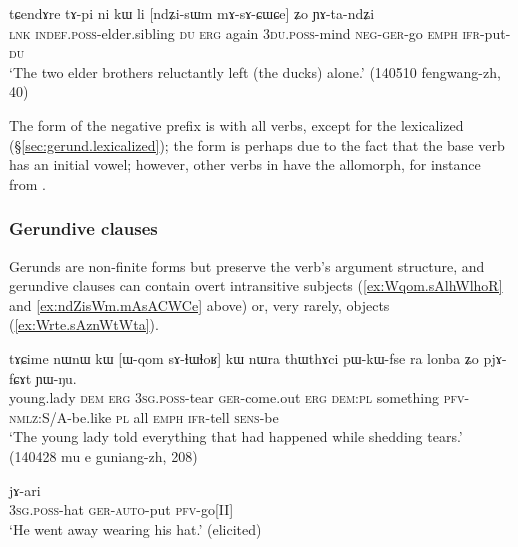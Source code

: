 \begin{exe}
\ex \label{ex:ndZisWm.mAsACWCe}
\gll tɕendɤre tɤ-pi ni kɯ li [ndʑi-sɯm mɤ-sɤ-ɕɯ\redp{}ɕe] ʑo ɲɤ-ta-ndʑi \\
\textsc{lnk} \textsc{indef}.\textsc{poss}-elder.sibling \textsc{du} \textsc{erg} again \textsc{3du}.\textsc{poss}-mind \textsc{neg}-\textsc{ger}-go \textsc{emph} \textsc{ifr}-put-\textsc{du} \\
\glt `The two elder brothers reluctantly left (the ducks) alone.' (140510 fengwang-zh, 40)
\end{exe}

The form of the negative prefix is  with all verbs, except for the lexicalized  (§\ref{sec:gerund.lexicalized}); the form  is perhaps due to the fact that the base verb  has an initial  vowel; however, other verbs in  have the  allomorph, for instance  from .


\subsubsection{Gerundive clauses}  \label{sec:gerund.clauses}
Gerunds are non-finite forms but preserve the verb's argument structure, and gerundive clauses can contain overt intransitive subjects (\ref{ex:Wqom.sAlhWlhoR} and \ref{ex:ndZisWm.mAsACWCe} above) or, very rarely, objects (\ref{ex:Wrte.sAznWtWta}).

\begin{exe}
\ex \label{ex:Wqom.sAlhWlhoR}
\gll tɤɕime nɯnɯ kɯ [ɯ-qom sɤ-ɬɯ\redp{}ɬoʁ] kɯ nɯra thɯthɤci pɯ-kɯ-fse ra lonba ʑo pjɤ-fɕɤt ɲɯ-ŋu. \\
young.lady \textsc{dem} \textsc{erg} \textsc{3sg}.\textsc{poss}-tear \textsc{ger}-come.out \textsc{erg} \textsc{dem}:\textsc{pl} something \textsc{pfv}-\textsc{nmlz}:S/A-be.like \textsc{pl} all \textsc{emph} \textsc{ifr}-tell \textsc{sens}-be \\
\glt `The young lady told everything that had happened while shedding tears.' (140428 mu e guniang-zh, 208)
\end{exe}

\begin{exe}
\ex \label{ex:Wrte.sAznWtWta}
 jɤ-ari \\
\textsc{3sg}.\textsc{poss}-hat \textsc{ger}-\textsc{auto}-put \textsc{pfv}-go[II] \\
\glt `He went away wearing his hat.' (elicited)
\end{exe}

